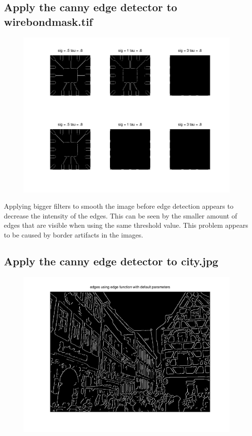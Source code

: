 \documentclass{article}
\begin{document}
	\subsection{Apply the canny edge detector to wirebondmask.tif}
	\begin{figure}[H]
		\includegraphics[width=\linewidth]{Q5/partC.png}
	\end{figure}
	Applying bigger filters to smooth the image before edge detection appears to decrease the intensity of the edges. This can be seen by the smaller amount of edges that are visible when using the same threshold value. This problem appears to be caused by border artifacts in the images. 
	
	
	\newpage
	\subsection{Apply the canny edge detector to city.jpg}
	\begin{figure}[H]
		\includegraphics[width=\linewidth]{Q5/partD1.png}
	\end{figure}
	
\end{document}
